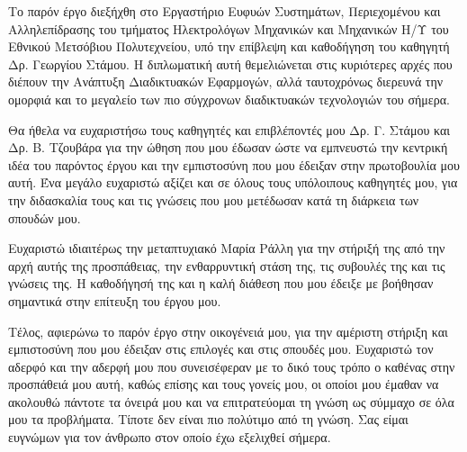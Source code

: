 \begin{acknowledgements}
Το παρόν έργο διεξήχθη στο Εργαστήριο Ευφυών Συστημάτων, Περιεχομένου και Αλληλεπίδρασης του τμήματος Ηλεκτρολόγων Μηχανικών και Μηχανικών Η/Υ του Εθνικού Μετσόβιου Πολυτεχνείου, υπό την επίβλεψη και καθοδήγηση του καθηγητή Δρ. Γεωργίου Στάμου. Η διπλωματική αυτή θεμελιώνεται στις κυριότερες αρχές που διέπουν την Ανάπτυξη Διαδικτυακών Εφαρμογών, αλλά ταυτοχρόνως διερευνά την ομορφιά και το μεγαλείο των πιο σύγχρονων διαδικτυακών τεχνολογιών του σήμερα.

Θα ήθελα να ευχαριστήσω τους καθηγητές και επιβλέποντές μου Δρ. Γ. Στάμου και Δρ. Β. Τζουβάρα για την ώθηση που μου έδωσαν ώστε να εμπνευστώ την κεντρική ιδέα του παρόντος έργου και την εμπιστοσύνη που μου έδειξαν στην πρωτοβουλία μου αυτή. Ένα μεγάλο ευχαριστώ αξίζει και σε όλους τους υπόλοιπους καθηγητές μου, για την διδασκαλία τους και τις γνώσεις που μου μετέδωσαν κατά τη διάρκεια των σπουδών μου. 

Ευχαριστώ ιδιαιτέρως την μεταπτυχιακό Μαρία Ράλλη για την στήριξή της από την αρχή αυτής της προσπάθειας, την ενθαρρυντική στάση της, τις συβουλές της και τις γνώσεις της. Η καθοδήγησή της και η καλή διάθεση που μου έδειξε με βοήθησαν σημαντικά στην επίτευξη του έργου μου.

Τέλος, αφιερώνω το παρόν έργο στην οικογένειά μου, για την αμέριστη στήριξη και εμπιστοσύνη που μου έδειξαν στις επιλογές και στις σπουδές μου. Ευχαριστώ τον αδερφό και την αδερφή μου που συνεισέφεραν με το δικό τους τρόπο ο καθένας στην προσπάθειά μου αυτή, καθώς επίσης και τους γονείς μου, οι οποίοι μου έμαθαν να ακολουθώ πάντοτε τα όνειρά μου και να επιτρατεύομαι τη γνώση ως σύμμαχο σε όλα μου τα προβλήματα. Τίποτε δεν είναι πιο πολύτιμο από τη γνώση. Σας είμαι ευγνώμων για τον άνθρωπο στον οποίο έχω εξελιχθεί σήμερα.
\end{acknowledgements}


